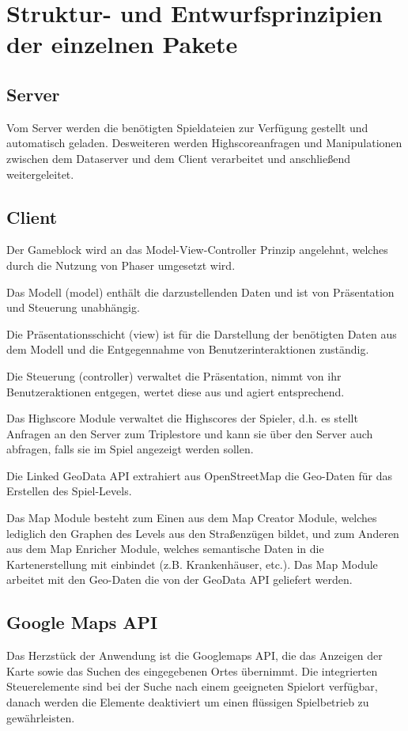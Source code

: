 \documentclass[11pt,a4paper]{article}
\begin{document}
\section{Struktur- und Entwurfsprinzipien der einzelnen Pakete}
\subsection{Server} Vom Server werden die benötigten Spieldateien zur Verfügung gestellt und automatisch geladen. Desweiteren werden Highscoreanfragen und Manipulationen zwischen dem Dataserver und dem Client verarbeitet und anschließend weitergeleitet.

\subsection{Client}
Der Gameblock wird an das Model-View-Controller Prinzip angelehnt, welches durch die Nutzung von Phaser umgesetzt wird. \bigskip

Das Modell (model) enthält die darzustellenden Daten und ist von Präsentation und Steuerung unabhängig.\bigskip

Die Präsentationsschicht (view) ist für die Darstellung der benötigten Daten aus dem Modell und die Entgegennahme von Benutzerinteraktionen zuständig.\bigskip

Die Steuerung (controller) verwaltet die Präsentation, nimmt von ihr Benutzeraktionen entgegen, wertet diese aus und agiert entsprechend.\bigskip

Das Highscore Module verwaltet die Highscores der Spieler, d.h. es stellt Anfragen an den Server zum Triplestore und kann sie über den Server auch abfragen, falls sie im Spiel angezeigt werden sollen.\bigskip

Die Linked GeoData API extrahiert aus OpenStreetMap die Geo-Daten für das Erstellen des Spiel-Levels.\bigskip

Das Map Module besteht zum Einen aus dem Map Creator Module, welches lediglich den Graphen des Levels aus den Straßenzügen bildet, und zum Anderen aus dem Map Enricher Module, welches semantische Daten in die Kartenerstellung mit einbindet (z.B. Krankenhäuser, etc.). Das Map Module arbeitet mit den Geo-Daten die von der GeoData API geliefert werden.

\subsection{Google Maps API}

Das Herzstück der Anwendung ist die Googlemaps API, die das Anzeigen der Karte sowie das Suchen des eingegebenen Ortes übernimmt.
Die integrierten Steuerelemente sind bei der Suche nach einem  geeigneten Spielort verfügbar, danach werden die Elemente deaktiviert um  einen flüssigen Spielbetrieb zu gewährleisten.
\end{document}
